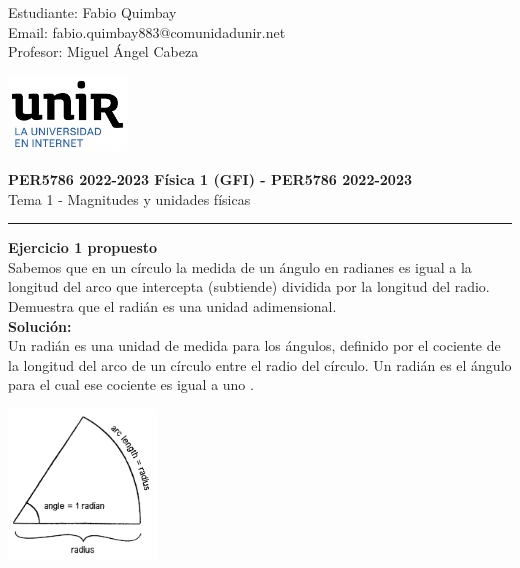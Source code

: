 \documentclass[11pt,letterpaper]{article}
\begin{document}
\pagestyle{plain}

\begin{flushleft}
Estudiante: Fabio Quimbay\\
Email: fabio.quimbay883@comunidadunir.net\\
Profesor: Miguel Ángel Cabeza\\
\end{flushleft}

\begin{flushright}\vspace{-20mm}
\includegraphics[height=2cm]{logo.png}
\end{flushright}
 
\begin{center}\vspace{0cm}
\textbf{\large PER5786 2022-2023  Física 1 (GFI) - PER5786 2022-2023}\\
 Tema 1 - Magnitudes y unidades físicas
\end{center}

 
\rule{\linewidth}{0.1mm}

\bigskip
\bigskip

\textbf{Ejercicio 1 propuesto}\\

Sabemos que en un círculo la medida de un ángulo en radianes es igual a la longitud del arco que intercepta (subtiende) dividida por la longitud del radio. Demuestra que el radián es una unidad adimensional.\\

\textbf{Solución:}\\

Un radián es una unidad de medida para los ángulos, definido por el cociente de la longitud del arco de un círculo entre el radio del círculo. Un radián es el ángulo para el cual ese cociente es igual a uno \cite{KA}.

\begin{center}
\includegraphics[height=4cm]{radian.png}
\end{center}
\end{document}
